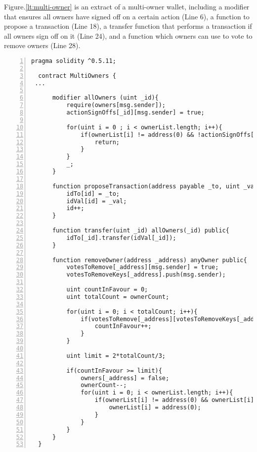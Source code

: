 \documentclass{article}
\begin{document}
Figure.\ref{lt:multi-owner} is an extract of a multi-owner wallet, including a modifier that ensures all owners have signed off on a certain action (Line 6), a function to propose a transaction (Line 18), a transfer function that performs a transaction if all owners sign off on it (Line 24), and a function which owners can use to vote to remove owners (Line 28).

  \small\begin{lstlisting}[language=DEA,basicstyle=\scriptsize,numbers=left,numbersep=2pt,xleftmargin=0.3cm,escapechar=\%,label={lt:multi-owner},caption={A wallet smart contract allowing for multiple owners.}]
  pragma solidity ^0.5.11;
  
  contract MultiOwners {
 ...
 
      modifier allOwners (uint _id){
          require(owners[msg.sender]);
          actionSignOffs[_id][msg.sender] = true;
  
          for(uint i = 0 ; i < ownerList.length; i++){
              if(ownerList[i] != address(0) && !actionSignOffs[_id][ownerList[i]]){
                  return;
              }
          }
          _;
      }

      function proposeTransaction(address payable _to, uint _val) public anyOwner{
          idTo[id] = _to;
          idVal[id] = _val;
          id++;
      }
  
      function transfer(uint _id) allOwners(_id) public{
          idTo[_id].transfer(idVal[_id]);
      }
      
      function removeOwner(address _address) anyOwner public{
          votesToRemove[_address][msg.sender] = true;
          votesToRemoveKeys[_address].push(msg.sender);
  
          uint countInFavour = 0;
          uint totalCount = ownerCount;
  
          for(uint i = 0; i < totalCount; i++){
              if(votesToRemove[_address][votesToRemoveKeys[_address][i]]){
                  countInFavour++;
              }
          }
  
          uint limit = 2*totalCount/3;
  
          if(countInFavour >= limit){
              owners[_address] = false;
              ownerCount--;
              for(uint i = 0; i < ownerList.length; i++){
                  if(ownerList[i] != address(0) && ownerList[i] == _address){
                      ownerList[i] = address(0);
                  }
              }
          }
      }    
  }
 \end{lstlisting}\normalsize
\end{document}
